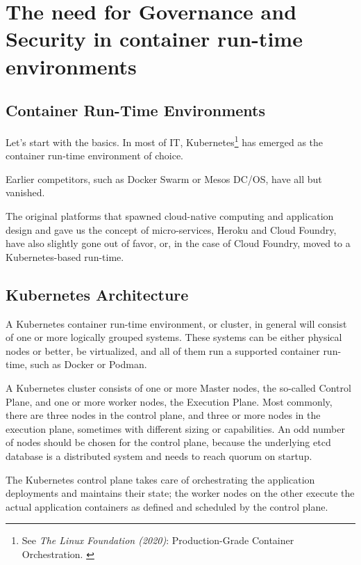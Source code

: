 %
%

\pagebreak
\section{The need for Governance and Security in container run-time environments}

\onehalfspacing

\subsection{Container Run-Time Environments}

Let's start with the basics. In most of IT, Kubernetes\footnote{See \textit{The Linux Foundation (2020)}: Production-Grade Container Orchestration. \cite{kubernetes}} has emerged as the container run-time environment of choice.

Earlier competitors, such as Docker Swarm or Mesos DC/OS, have all but vanished.

The original platforms that spawned cloud-native computing and application design and gave us the concept of micro-services, Heroku and Cloud Foundry, have also slightly gone out of favor, or, in the case of Cloud Foundry, moved to a Kubernetes-based run-time.

\subsection{Kubernetes Architecture}

A Kubernetes container run-time environment, or cluster, in general will consist of one or more logically grouped systems. These systems can be either physical nodes or better, be virtualized, and all of them run a supported container run-time, such as Docker or Podman.

A Kubernetes cluster consists of one or more Master nodes, the so-called Control Plane, and one or more worker nodes, the Execution Plane. Most commonly, there are three nodes in the control plane, and three or more nodes in the execution plane, sometimes with different sizing or capabilities. An odd number of nodes should be chosen for the control plane, because the underlying etcd database is a distributed system and needs to reach quorum on startup.

The Kubernetes control plane takes care of orchestrating the application deployments and maintains their state; the worker nodes on the other execute the actual application containers as defined and scheduled by the control plane.

